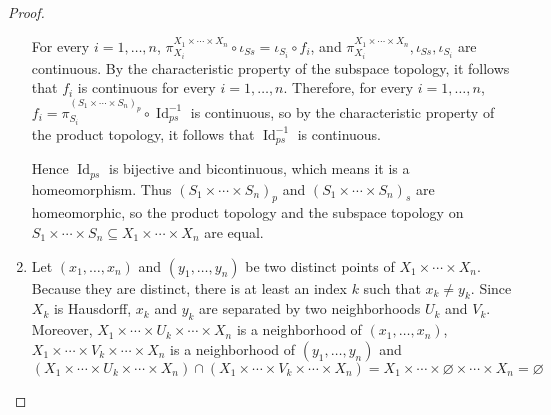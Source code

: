 \begin{proof}
\begin{enumerate}[label={(\alph*)}]
		      For every $i=1,\ldots,n$, $\pi^{X_{1}\times\cdots\times X_{n}}_{X_{i}}\circ \iota_{Ss} = \iota_{S_{i}}\circ f_{i}$, and $\pi^{X_{1}\times\cdots\times X_{n}}_{X_{i}}, \iota_{Ss}, \iota_{S_{i}}$ are continuous. By the characteristic property of the subspace topology, it follows that $f_{i}$ is continuous for every $i=1,\ldots,n$. Therefore, for every $i=1,\ldots,n$, $f_{i} = \pi^{{(S_{1}\times\cdots\times S_{n})}_{p}}_{S_{i}}\circ \operatorname{Id}_{ps}^{-1}$ is continuous, so by the characteristic property of the product topology, it follows that $\operatorname{Id}^{-1}_{ps}$ is continuous.

		      Hence $\operatorname{Id}_{ps}$ is bijective and bicontinuous, which means it is a homeomorphism. Thus ${(S_{1}\times\cdots\times S_{n})}_{p}$ and ${(S_{1}\times\cdots\times S_{n})}_{s}$ are homeomorphic, so the product topology and the subspace topology on $S_{1}\times\cdots\times S_{n}\subseteq X_{1}\times\cdots\times X_{n}$ are equal.
		\item Let $(x_{1}, \ldots, x_{n})$ and $(y_{1}, \ldots, y_{n})$ be two distinct points of $X_{1}\times \cdots\times X_{n}$. Because they are distinct, there is at least an index $k$ such that $x_{k}\ne y_{k}$. Since $X_{k}$ is Hausdorff, $x_{k}$ and $y_{k}$ are separated by two neighborhoods $U_{k}$ and $V_{k}$. Moreover, $X_{1}\times\cdots \times U_{k}\times\cdots\times X_{n}$ is a neighborhood of $(x_{1}, \ldots, x_{n})$, $X_{1}\times\cdots \times V_{k}\times\cdots\times X_{n}$ is a neighborhood of $(y_{1}, \ldots, y_{n})$ and
		      \[
			      (X_{1}\times\cdots \times U_{k}\times\cdots\times X_{n}) \cap (X_{1}\times\cdots \times V_{k}\times\cdots\times X_{n}) = X_{1}\times\cdots \times \varnothing\times\cdots\times X_{n} = \varnothing
		      \]


\end{enumerate}
\end{proof}
